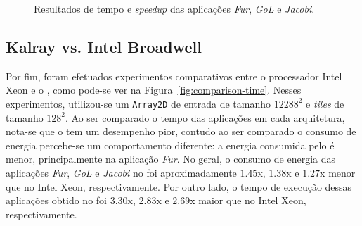 \begin{figure}[t]
    \centering
    \qquad
    \caption{Resultados de tempo e \textit{speedup} das aplicações \textit{Fur}, \textit{GoL} e \textit{Jacobi}.}
    \label{fig:scalability}
\end{figure}

\subsection{Kalray \mppa vs. Intel Broadwell}

Por fim, foram efetuados experimentos comparativos entre o processador Intel
Xeon e o \mppa, como pode-se ver na Figura~\ref{fig:comparison-time}. Nesses
experimentos, utilizou-se um \texttt{Array2D} de entrada de tamanho $12288^2$ e
\textit{tiles} de tamanho $128^2$. Ao ser comparado o tempo das aplicações em
cada arquitetura, nota-se que o \mppa tem um desempenho pior, contudo ao ser
comparado o consumo de energia percebe-se um comportamento diferente: a energia
consumida pelo \mppa é menor, principalmente na aplicação \textit{Fur}. No
geral, o consumo de energia das aplicações \textit{Fur}, \textit{GoL} e
\textit{Jacobi} no \mppa foi aproximadamente $1.45$x, $1.38$x e $1.27$x menor
que no Intel Xeon, respectivamente. Por outro lado, o tempo de execução dessas
aplicações obtido no \mppa foi  $3.30$x, $2.83$x e $2.69$x maior que no Intel
Xeon, respectivamente.


